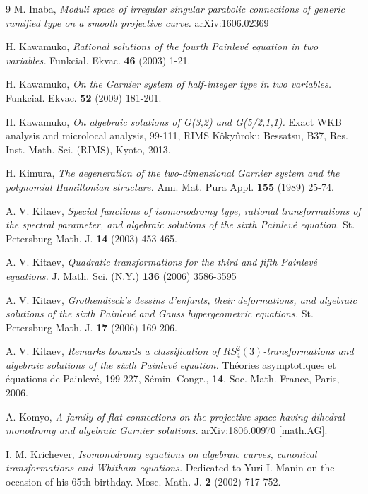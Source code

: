 \documentclass[12]{amsart}
\begin{document}
\begin{thebibliography}{9}
{\sc M. Inaba}, 
\emph{Moduli space of irregular singular parabolic connections of generic ramified type on a smooth projective curve.} 
arXiv:1606.02369

{\sc H. Kawamuko}, 
\emph{Rational solutions of the fourth Painlev\'e equation in two variables.}
Funkcial. Ekvac. {\bf 46} (2003) 1-21.

{\sc H. Kawamuko}, 
\emph{On the Garnier system of half-integer type in two variables.} 
Funkcial. Ekvac. {\bf 52} (2009) 181-201.

{\sc H. Kawamuko},
\emph{On algebraic solutions of G(3,2) and G(5/2,1,1).} 
Exact WKB analysis and microlocal analysis, 99-111, 
RIMS K\^oky\^uroku Bessatsu, B37, Res. Inst. Math. Sci. (RIMS), Kyoto, 2013. 

{\sc H. Kimura}, 
\emph{The degeneration of the two-dimensional Garnier system and the polynomial Hamiltonian structure. }
Ann. Mat. Pura Appl. {\bf 155} (1989) 25-74. 

{\sc A. V. Kitaev}, 
\emph{Special functions of isomonodromy type, rational transformations of the spectral parameter, 
and algebraic solutions of the sixth Painlev\'e equation.} 
St. Petersburg Math. J. {\bf 14} (2003) 453-465.

{\sc A. V. Kitaev}, 
\emph{Quadratic transformations for the third and fifth Painlev\'e equations.} 
J. Math. Sci. (N.Y.) {\bf 136} (2006) 3586-3595
 
{\sc A. V. Kitaev}, 
\emph{Grothendieck's dessins d'enfants, their deformations, and algebraic solutions of the sixth Painlev\'e and Gauss hypergeometric equations.}
St. Petersburg Math. J. {\bf 17} (2006) 169-206.

{\sc A. V. Kitaev}, 
\emph{Remarks towards a classification of $RS^2_4(3)$-transformations and algebraic solutions of the sixth Painlev\'e equation.} Th\'eories asymptotiques et \'equations de Painlev\'e, 199-227, S\'emin. Congr., {\bf 14}, Soc. Math. France, Paris, 2006.

{\sc A. Komyo}, 
\emph{A family of flat connections on the projective space having dihedral monodromy and algebraic Garnier solutions.}
arXiv:1806.00970 [math.AG].

{\sc I. M. Krichever}, 
\emph{Isomonodromy equations on algebraic curves, canonical transformations and Whitham equations.}
Dedicated to Yuri I. Manin on the occasion of his 65th birthday. Mosc. Math. J. {\bf 2} (2002) 717-752.


\end{thebibliography}
\end{document}
